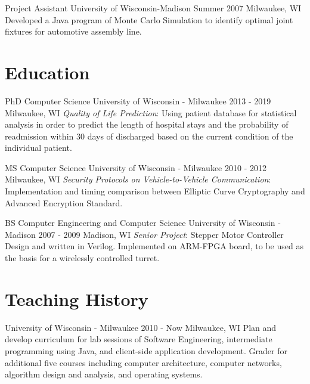 \documentclass[]{clean-resume}
\begin{document}
\entry
	{Project Assistant}
	{University of Wisconsin-Madison}
	{Summer 2007}
	{Milwaukee, WI}
	{
		Developed a Java program of Monte Carlo Simulation to identify optimal joint fixtures for automotive assembly line.		
	}

\section{Education}

\entry
	{PhD Computer Science}
	{University of Wisconsin - Milwaukee}
	{2013 - 2019}
	{Milwaukee, WI}
	{
		\emph{Quality of Life Prediction}: Using patient database for statistical analysis in order to predict the length of hospital stays and the probability of readmission within 30 days of discharged based on the current condition of the individual patient.
	}

\entry
	{MS Computer Science}
	{University of Wisconsin - Milwaukee}
	{2010 - 2012}
	{Milwaukee, WI}
	{
		\emph{Security Protocols on Vehicle-to-Vehicle Communication}: Implementation and timing comparison between Elliptic Curve Cryptography and Advanced Encryption Standard.
	}

\entry
	{BS Computer Engineering and Computer Science}
	{University of Wisconsin - Madison}
	{2007 - 2009}
	{Madison, WI}
	{
		\emph{Senior Project}: Stepper Motor Controller Design and written in Verilog. Implemented on 
		ARM-FPGA board, to be used as the basis for a wirelessly controlled turret.
	}

\section{Teaching History}

\entry
	{University of Wisconsin - Milwaukee}
	{}
	{2010 - Now}
	{Milwaukee, WI}
	{
		Plan and develop curriculum for lab sessions of Software Engineering, intermediate programming using Java, and client-side application development. Grader for additional five courses including computer architecture, computer networks, algorithm design and analysis, and operating systems.
	}
\end{document}
